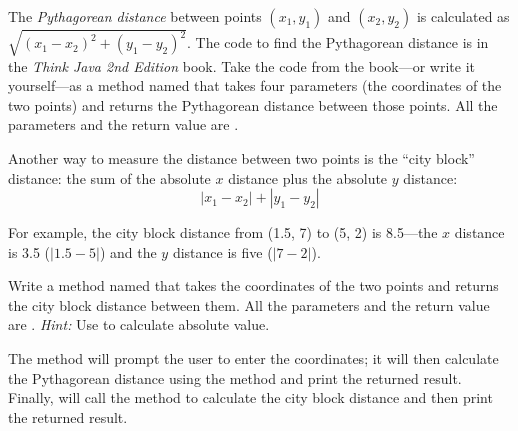 \begin{exercise}
The {\em Pythagorean distance} between points $(x_1, y_1)$ and $(x_2, y_2)$ is calculated as $\sqrt {(x_1-x_2)^2 + (y_1-y_2)^2}$. The code to find the Pythagorean distance is in the {\em Think Java 2nd Edition} book. Take the code from the book---or write it yourself---as a method named  that takes four parameters (the coordinates of the two points) and returns the Pythagorean distance between those points. All the parameters and the return value are .

Another way to measure the distance between two points is the ``city block'' distance: the sum of the absolute $x$ distance plus the absolute $y$ distance:
\begin{equation*}
|x_1 - x_2| + |y_1 - y_2|
\end{equation*}

For example, the city block distance from (1.5, 7) to (5, 2) is 8.5---the $x$ distance is 3.5 ($|1.5 - 5|$) and the $y$ distance is five ($|7 - 2|$).

Write a method named  that takes the coordinates of the two points and returns the city block distance between them. All the parameters and the return value are . {\em Hint:} Use  to calculate absolute value.

The  method will prompt the user to enter the coordinates; it will then calculate the Pythagorean distance using the  method and print the returned result. Finally,  will call the  method to calculate the city block distance and then print the returned result.
\end{exercise}

